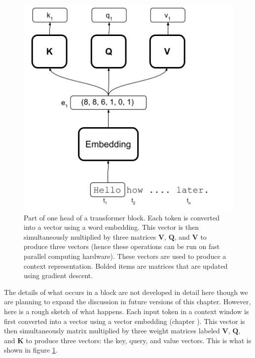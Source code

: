 \begin{figure}[h]
\centering
\includegraphics[scale=.4]{./images/transformerBlockBasic.png}
\caption[Jeff Yoshimi with consultation from Tim Meyer.]{Part of one head of a transformer block. Each token is converted into a vector using a word embedding. This vector is then simultaneously multiplied by three matrices  $\textbf{V}$, $\textbf{Q}$, and $\textbf{V}$ to produce three vectors (hence these operations can be run on fast parallel computing hardware). These vectors are used to produce a context representation. Bolded items are matrices that are updated using gradient descent.}
\label{transformerBlockSimple}
\end{figure}

The details of what occurs in a block are not developed in detail here though we are planning to expand the discussion in future versions of this chapter. However, here is a rough sketch of what happens. Each input token in a context window is first converted into a vector using a vector embedding (chapter ). This vector is then simultaneously matrix multiplied by three weight matrices labeled $\textbf{V}$, $\textbf{Q}$, and $\textbf{K}$ to produce three vectors: the key, query, and value vectors. This is what is shown in figure \ref{transformerBlockSimple}.

